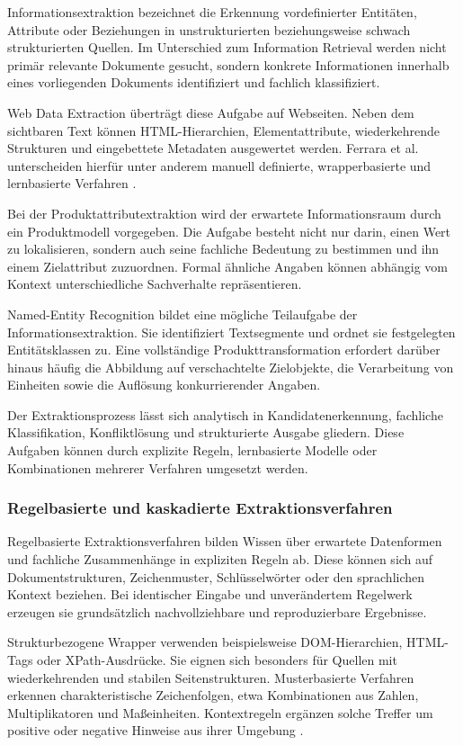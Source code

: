 Informationsextraktion bezeichnet die Erkennung vordefinierter Entitäten, Attribute oder Beziehungen in unstrukturierten beziehungsweise schwach strukturierten 
Quellen. Im Unterschied zum Information Retrieval werden nicht primär relevante Dokumente gesucht, sondern konkrete Informationen innerhalb eines vorliegenden 
Dokuments identifiziert und fachlich klassifiziert.

Web Data Extraction überträgt diese Aufgabe auf Webseiten. Neben dem sichtbaren Text können HTML-Hierarchien, Elementattribute, wiederkehrende Strukturen und 
eingebettete Metadaten ausgewertet werden. Ferrara et al. unterscheiden hierfür unter anderem manuell definierte, wrapperbasierte und lernbasierte Verfahren 
\cite{ferrara2014web}.

Bei der Produktattributextraktion wird der erwartete Informationsraum durch ein Produktmodell vorgegeben. Die Aufgabe besteht nicht nur darin, einen Wert zu 
lokalisieren, sondern auch seine fachliche Bedeutung zu bestimmen und ihn einem Zielattribut zuzuordnen. Formal ähnliche Angaben können abhängig vom Kontext 
unterschiedliche Sachverhalte repräsentieren.

Named-Entity Recognition bildet eine mögliche Teilaufgabe der Informationsextraktion. Sie identifiziert Textsegmente und ordnet sie festgelegten Entitätsklassen 
zu. Eine vollständige Produkttransformation erfordert darüber hinaus häufig die Abbildung auf verschachtelte Zielobjekte, die Verarbeitung von Einheiten sowie 
die Auflösung konkurrierender Angaben.

Der Extraktionsprozess lässt sich analytisch in Kandidatenerkennung, fachliche Klassifikation, Konfliktlösung und strukturierte Ausgabe gliedern. Diese Aufgaben 
können durch explizite Regeln, lernbasierte Modelle oder Kombinationen mehrerer Verfahren umgesetzt werden.

\subsubsection{Regelbasierte und kaskadierte Extraktionsverfahren}

Regelbasierte Extraktionsverfahren bilden Wissen über erwartete Datenformen und fachliche Zusammenhänge in expliziten Regeln ab. Diese können sich auf 
Dokumentstrukturen, Zeichenmuster, Schlüsselwörter oder den sprachlichen Kontext beziehen. Bei identischer Eingabe und unverändertem Regelwerk erzeugen sie 
grundsätzlich nachvollziehbare und reproduzierbare Ergebnisse.

Strukturbezogene Wrapper verwenden beispielsweise DOM-Hierarchien, HTML-Tags oder XPath-Ausdrücke. Sie eignen sich besonders für Quellen mit wiederkehrenden und 
stabilen Seitenstrukturen. Musterbasierte Verfahren erkennen charakteristische Zeichenfolgen, etwa Kombinationen aus Zahlen, Multiplikatoren und Maßeinheiten. 
Kontextregeln ergänzen solche Treffer um positive oder negative Hinweise aus ihrer Umgebung \cite{ferrara2014web}.

